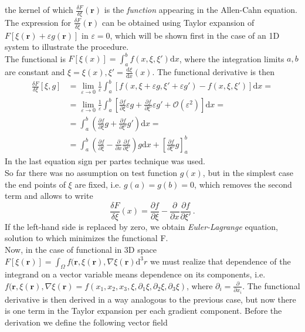 the kernel of which $\frac{\delta F}{\delta \xi}(\mathbf{r})$ is the \textit{function} appearing in the Allen-Cahn equation. The expression for $\frac{\delta F}{\delta \xi}(\mathbf{r})$ can be obtained using Taylor expansion of $F[\xi(\mathbf{r})+\varepsilon g(\mathbf{r})]$ in $\varepsilon=0$, which will be shown first in the case of an 1D system to illustrate the procedure. \\
The functional is $ F[\xi(x)] = \int_a^b f(x, \xi,\xi')\mathrm{d}x $, where the integration limits $a,b$ are constant and $\xi = \xi(x),\xi'=\frac{\mathrm{d}\xi}{\mathrm{d}x}(x)$. The functional derivative is then
\begin{equation}
	\begin{split}
		\frac{\delta F}{\delta \xi}[\xi,g] &= \lim_{\varepsilon\rightarrow0}\frac{1}{\varepsilon}\int_a^b [f(x,\xi+\varepsilon g,\xi'+\varepsilon g')-f(x,\xi,\xi') ]\mathrm{d}x = \\
		&= \lim_{\varepsilon\rightarrow0}\frac{1}{\varepsilon}\int_a^b \left[\frac{\partial f}{\partial \xi}\varepsilon g + \frac{\partial f}{\partial \xi'}\varepsilon g' + \mathcal{O}(\varepsilon^2)\right]\mathrm{d}x = \\
		&= \int_a^b \left(\frac{\partial f}{\partial \xi} g + \frac{\partial f}{\partial \xi'} g' \right)\mathrm{d}x = \\
		&= \int_a^b \left(\frac{\partial f}{\partial \xi} - \frac{\partial}{\partial x}\frac{\partial f}{\partial \xi'} \right)g\mathrm{d}x + \left[\frac{\partial f}{\partial \xi'}g\right]_{a}^b
	\end{split}
\end{equation}
In the last equation sign per partes technique was used. \\
So far there was no assumption on test function $g(x)$, but in the simplest case the end points of $\xi$ are fixed, i.e. $g(a)=g(b)=0$, which removes the second term and allows to write 
\begin{equation}
	\frac{\delta F}{\delta \xi}(x) = \frac{\partial f}{\partial \xi} - \frac{\partial}{\partial x}\frac{\partial f}{\partial \xi'} \,.
\end{equation}
If the left-hand side is replaced by zero, we obtain \textit{Euler-Lagrange} equation, solution to which minimizes the functional F. \\
Now, in the case of functional in 3D space $ F[\xi(\bm{r})] = \int_\Omega f(\bm{r}, \xi(\bm{r}),\nabla\xi(\bm{r})\mathrm{d}^3r $ we must realize that dependence of the integrand on a vector variable means dependence on its components, i.e. $f(\bm{r}, \xi(\bm{r}),\nabla\xi(\bm{r})=f(x_1,x_2,x_3,\xi,\partial_1\xi,\partial_2\xi,\partial_3\xi)$, where $\partial_i = \frac{\partial}{\partial x_i}$. The functional derivative is then derived in a way analogous to the previous case, but now there is one term in the Taylor expansion per each gradient component. Before the derivation we define the following vector field
